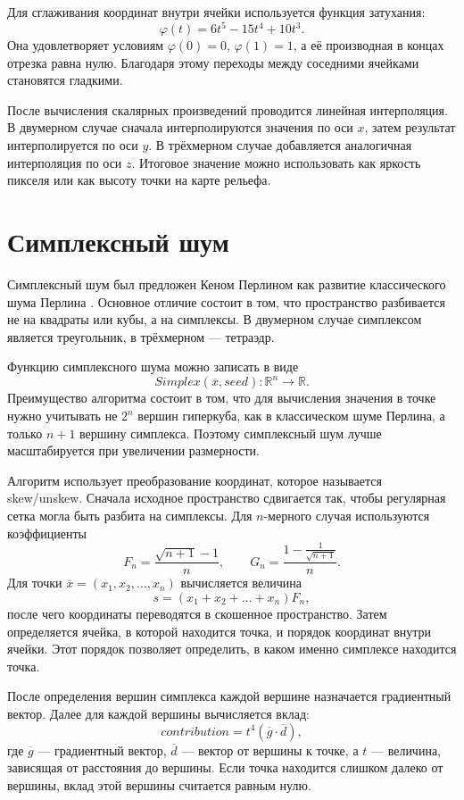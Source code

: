 Для сглаживания координат внутри ячейки используется функция затухания:
\[
    \varphi(t)=6t^5-15t^4+10t^3.
\]
Она удовлетворяет условиям $\varphi(0)=0$, $\varphi(1)=1$, а её производная в концах отрезка равна нулю. Благодаря этому переходы между соседними ячейками становятся гладкими.

После вычисления скалярных произведений проводится линейная интерполяция. В двумерном случае сначала интерполируются значения по оси $x$, затем результат интерполируется по оси $y$. В трёхмерном случае добавляется аналогичная интерполяция по оси $z$. Итоговое значение можно использовать как яркость пикселя или как высоту точки на карте рельефа.

\section{Симплексный шум}

Симплексный шум был предложен Кеном Перлином как развитие классического шума Перлина \cite{simplex_noise}. Основное отличие состоит в том, что пространство разбивается не на квадраты или кубы, а на симплексы. В двумерном случае симплексом является треугольник, в трёхмерном --- тетраэдр.

Функцию симплексного шума можно записать в виде
\[
    Simplex(\overline{x}, seed): \mathbb{R}^n \rightarrow \mathbb{R}.
\]
Преимущество алгоритма состоит в том, что для вычисления значения в точке нужно учитывать не $2^n$ вершин гиперкуба, как в классическом шуме Перлина, а только $n+1$ вершину симплекса. Поэтому симплексный шум лучше масштабируется при увеличении размерности.

Алгоритм использует преобразование координат, которое называется skew/unskew. Сначала исходное пространство сдвигается так, чтобы регулярная сетка могла быть разбита на симплексы. Для $n$-мерного случая используются коэффициенты
\[
    F_n=\frac{\sqrt{n+1}-1}{n}, \qquad
    G_n=\frac{1-\frac{1}{\sqrt{n+1}}}{n}.
\]
Для точки $\overline{x}=(x_1,x_2,\ldots,x_n)$ вычисляется величина
\[
    s=(x_1+x_2+\ldots+x_n)F_n,
\]
после чего координаты переводятся в скошенное пространство. Затем определяется ячейка, в которой находится точка, и порядок координат внутри ячейки. Этот порядок позволяет определить, в каком именно симплексе находится точка.

После определения вершин симплекса каждой вершине назначается градиентный вектор. Далее для каждой вершины вычисляется вклад:
\[
    contribution = t^4 (\overline{g}\cdot\overline{d}),
\]
где $\overline{g}$ --- градиентный вектор, $\overline{d}$ --- вектор от вершины к точке, а $t$ --- величина, зависящая от расстояния до вершины. Если точка находится слишком далеко от вершины, вклад этой вершины считается равным нулю.

